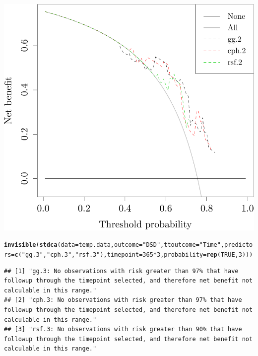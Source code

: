 \documentclass{article}\usepackage[]{graphicx}\usepackage[]{color}
\makeatletter
\def\maxwidth{ %
  \ifdim\Gin@nat@width>\linewidth
    \linewidth
  \else
    \Gin@nat@width
  \fi
}
\newcommand{\hlnum}[1]{\textcolor[rgb]{0.686,0.059,0.569}{#1}}%
\newcommand{\hlstr}[1]{\textcolor[rgb]{0.192,0.494,0.8}{#1}}%
\newcommand{\hlopt}[1]{\textcolor[rgb]{0,0,0}{#1}}%
\newcommand{\hlstd}[1]{\textcolor[rgb]{0.345,0.345,0.345}{#1}}%
\newcommand{\hlkwc}[1]{\textcolor[rgb]{0.333,0.667,0.333}{#1}}%
\newcommand{\hlkwd}[1]{\textcolor[rgb]{0.737,0.353,0.396}{\textbf{#1}}}%
\newenvironment{kframe}{%
 \def\at@end@of@kframe{}%
 \ifinner\ifhmode%
  \def\at@end@of@kframe{\end{minipage}}%
  \begin{minipage}{\columnwidth}%
 \fi\fi%
 \def\FrameCommand##1{\hskip\@totalleftmargin \hskip-\fboxsep
 \colorbox{shadecolor}{##1}\hskip-\fboxsep
     \hskip-\linewidth \hskip-\@totalleftmargin \hskip\columnwidth}%
 \MakeFramed {\advance\hsize-\width
   \@totalleftmargin\z@ \linewidth\hsize
   \@setminipage}}%
 {\par\unskip\endMakeFramed%
 \at@end@of@kframe}
\newenvironment{knitrout}{}{} %
\makeatother
\begin{document}
\begin{knitrout}
{\centering \includegraphics[width=\maxwidth]{figure/05-model-selection-dca-2} 

}


\begin{kframe}\begin{alltt}
\hlkwd{invisible}\hlstd{(}\hlkwd{stdca}\hlstd{(}\hlkwc{data} \hlstd{= temp.data,} \hlkwc{outcome} \hlstd{=} \hlstr{"DSD"}\hlstd{,} \hlkwc{ttoutcome} \hlstd{=} \hlstr{"Time"}\hlstd{,} \hlkwc{predictors} \hlstd{=} \hlkwd{c}\hlstd{(}\hlstr{"gg.3"}\hlstd{,} \hlstr{"cph.3"}\hlstd{,} \hlstr{"rsf.3"}\hlstd{),} \hlkwc{timepoint} \hlstd{=} \hlnum{365}\hlopt{*}\hlnum{3}\hlstd{,} \hlkwc{probability} \hlstd{=} \hlkwd{rep}\hlstd{(}\hlnum{TRUE}\hlstd{,} \hlnum{3}\hlstd{)))}
\end{alltt}
\begin{verbatim}
## [1] "gg.3: No observations with risk greater than 97% that have followup through the timepoint selected, and therefore net benefit not calculable in this range." 
## [2] "cph.3: No observations with risk greater than 97% that have followup through the timepoint selected, and therefore net benefit not calculable in this range."
## [3] "rsf.3: No observations with risk greater than 90% that have followup through the timepoint selected, and therefore net benefit not calculable in this range."
\end{verbatim}
\end{kframe}


\end{knitrout}
\end{document}
